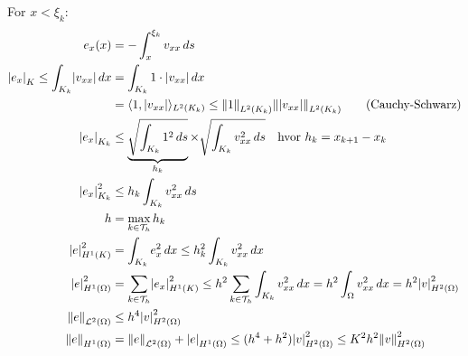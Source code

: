 \documentclass[../main.tex]{subfiles}
\begin{document}
For $x < \xi_k$:
\begin{align*}
    e_x(x)                                           & =-\int_{x}^{\xi_k} v_{xx} \, ds                                                                                                                                                \\
    \abs*{e_x}_K \leq \int_{K_k} \abs*{v_{xx}} \, dx & = \int_{K_k} 1\cdot \abs*{v_{xx}} \, dx                                                                                                                                        \\
                                                     & = \inner{1, \abs*{v_{xx}}}_{L^2(K_k)} \leq \norm*{1}_{L^2(K_k)} \norm*{\abs*{v_{xx}}}_{L^2(K_k)} \tag{Cauchy-Schwarz}                                                          \\
    \abs*{e_x}_{K_k}                                 & \leq \underbrace{\sqrt{\int_{K_k} 1^2 \, ds}}_{h_k} \times \sqrt{\int_{K_k} v_{xx}^2 \, ds} \quad \text{hvor } h_k = x_{k+1} - x_k                                             \\
    \abs*{e_x}_{K_k}^2                               & \leq h_k \int_{K_k} v_{xx}^2 \, ds                                                                                                                                             \\
    h                                                & = \max_{k \in \mathcal{T}_h} h_k                                                                                                                                               \\
    \abs*{e}_{H^1(K)}^2                              & = \int_{K_k} e_x^2 \, dx \leq h_k^2 \int_{K_k} v_{xx}^2 \, dx                                                                                                                  \\
    \abs*{e}_{H^1(\Omega)}^2                         & = \sum_{k\in\mathcal{T}_h} \abs*{e_x}_{H^1(K)}^2 \leq h^2 \sum_{k\in\mathcal{T}_h} \int_{K_k} v_{xx}^2 \, dx = h^2 \int_{\Omega} v_{xx}^2 \, dx = h^2 \abs*{v}_{H^2(\Omega)}^2 \\
    \norm*{e}_{\mathcal{L}^2(\Omega)}                & \leq h^4 \abs*{v}_{H^2(\Omega)}^2                                                                                                                                              \\
    \norm*{e}_{H^1(\Omega)}                          & = \norm*{e}_{\mathcal{L}^2(\Omega)} + \abs*{e}_{H^1(\Omega)} \leq (h^4 + h^2) \abs*{v}_{H^2(\Omega)}^2 \leq K^2 h^2 \norm*{v}_{H^2(\Omega)}^2                                  \\
\end{align*}
\end{document}
